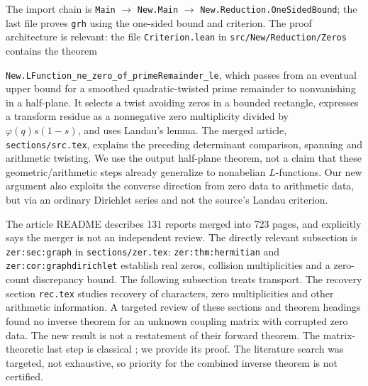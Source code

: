\documentclass[11pt]{article}
\theoremstyle{definition}\newtheorem{definition}[theorem]{Definition}
\begin{document}
The import chain is \texttt{Main} $\to$ \texttt{New.Main} $\to$ \texttt{New.Reduction.}\allowbreak\texttt{OneSidedBound}; the last file proves \texttt{grh} using the one-sided bound and criterion. The proof architecture is relevant: the file \texttt{Criterion.lean} in \texttt{src/New/Reduction/}\allowbreak\texttt{Zeros} contains the theorem\par\noindent\texttt{New.LFunction\_ne\_zero\_of\_primeRemainder\_le}, which passes from an eventual upper bound for a smoothed quadratic-twisted prime remainder to nonvanishing in a half-plane. It selects a twist avoiding zeros in a bounded rectangle, expresses a transform residue as a nonnegative zero multiplicity divided by $\varphi(q)s(1-s)$, and uses Landau's lemma. The merged article, \texttt{sections/src.tex}, explains the preceding determinant comparison, spanning and arithmetic twisting. We use the output half-plane theorem, not a claim that these geometric/arithmetic steps already generalize to nonabelian $L$-functions. Our new argument also exploits the converse direction from zero data to arithmetic data, but via an ordinary Dirichlet series and not the source's Landau criterion.

The article README \cite{article} describes 131 reports merged into 723 pages, and explicitly says the merger is not an independent review. The directly relevant subsection is \texttt{zer:sec:graph} in \texttt{sections/zer.tex}: \texttt{zer:thm:hermitian} and \texttt{zer:cor:graphdirichlet} establish real zeros, collision multiplicities and a zero-count discrepancy bound. The following subsection treats transport. The recovery section \texttt{rec.tex} studies recovery of characters, zero multiplicities and other arithmetic information. A targeted review of these sections and theorem headings found no inverse theorem for an unknown coupling matrix with corrupted zero data. The new result is not a restatement of their forward theorem. The matrix-theoretic last step is classical \cite{engel}; we provide its proof. The literature search was targeted, not exhaustive, so priority for the combined inverse theorem is not certified.
\end{document}
